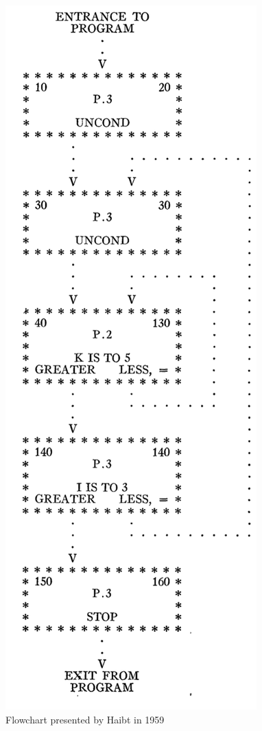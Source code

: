 \begin{figure}

    \includegraphics[width=0.9\linewidth]{Haibt1959_Flowchart.png} 
    \caption{Flowchart presented by Haibt in 1959}
    \label{fig:Haibt1959_Flowchart}



\end{figure}


